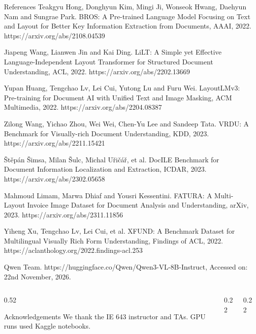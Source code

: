 \documentclass[final]{beamer}
\renewcommand{\small}{\fontsize{19}{23.5}\selectfont}
\renewcommand{\footnotesize}{\fontsize{17}{21}\selectfont}
\renewcommand{\scriptsize}{\fontsize{14}{16.6}\selectfont}
\newlength{\colwidth}\setlength{\colwidth}{25.9cm}
\newlength{\qrunit}\newcommand{\qrmodules}{37}
\begin{document}
\begin{frame}[t]
\begin{columns}[t]
\begin{column}{\colwidth}
\begin{block}{References}
\scriptsize\setlength{\parskip}{0.15ex}
Teakgyu Hong, Donghyun Kim, Mingi Ji, Wonseok Hwang, Daehyun Nam and Sungrae Park. BROS: A Pre-trained Language Model Focusing on Text and Layout for Better Key Information Extraction from Documents, AAAI, 2022. https://arxiv.org/abs/2108.04539\par
Jiapeng Wang, Lianwen Jin and Kai Ding. LiLT: A Simple yet Effective Language-Independent Layout Transformer for Structured Document Understanding, ACL, 2022. https://arxiv.org/abs/2202.13669\par
Yupan Huang, Tengchao Lv, Lei Cui, Yutong Lu and Furu Wei. LayoutLMv3: Pre-training for Document AI with Unified Text and Image Masking, ACM Multimedia, 2022. https://arxiv.org/abs/2204.08387\par
Zilong Wang, Yichao Zhou, Wei Wei, Chen-Yu Lee and Sandeep Tata. VRDU: A Benchmark for Visually-rich Document Understanding, KDD, 2023. https://arxiv.org/abs/2211.15421\par
Štěpán Šimsa, Milan Šulc, Michal Uřičář, et al. DocILE Benchmark for Document Information Localization and Extraction, ICDAR, 2023. https://arxiv.org/abs/2302.05658\par
Mahmoud Limam, Marwa Dhiaf and Yousri Kessentini. FATURA: A Multi-Layout Invoice Image Dataset for Document Analysis and Understanding, arXiv, 2023. https://arxiv.org/abs/2311.11856\par
Yiheng Xu, Tengchao Lv, Lei Cui, et al. XFUND: A Benchmark Dataset for Multilingual Visually Rich Form Understanding, Findings of ACL, 2022. https://aclanthology.org/2022.findings-acl.253\par
Qwen Team. https://huggingface.co/Qwen/Qwen3-VL-8B-Instruct, Accessed on: 22nd November, 2026.\par
\end{block}

\vspace{-0.8ex}
\begin{columns}[t,onlytextwidth]
\begin{column}{0.52\linewidth}
\begin{block}{Acknowledgements}
\small We thank the IE 643 instructor and TAs. GPU runs used Kaggle notebooks.
\end{block}
\end{column}
\begin{column}{0.22\linewidth}\centering{\footnotesize\textbf{GitHub}\par}\vspace{0.4ex}
\setlength{\qrunit}{3.5cm/\qrmodules}
\end{column}
\begin{column}{0.22\linewidth}\centering{\footnotesize\textbf{Demo video}\par}\vspace{0.4ex}
\setlength{\qrunit}{3.5cm/\qrmodules}
\end{column}
\end{columns}


\end{column}
\end{columns}
\end{frame}
\end{document}
